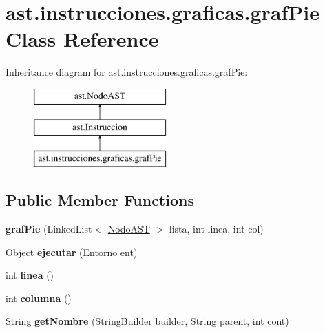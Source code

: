 \hypertarget{classast_1_1instrucciones_1_1graficas_1_1graf_pie}{}\section{ast.\+instrucciones.\+graficas.\+graf\+Pie Class Reference}
\label{classast_1_1instrucciones_1_1graficas_1_1graf_pie}
Inheritance diagram for ast.\+instrucciones.\+graficas.\+graf\+Pie\+:\begin{figure}[H]
\begin{center}
\leavevmode
\includegraphics[height=3.000000cm]{classast_1_1instrucciones_1_1graficas_1_1graf_pie}
\end{center}
\end{figure}
\subsection*{Public Member Functions}
\begin{DoxyCompactItemize}
\item 
\mbox{\label{classast_1_1instrucciones_1_1graficas_1_1graf_pie_a2b80b9a72bc90648fefa60db2c270a4e}} 
{\bfseries graf\+Pie} (Linked\+List$<$ \mbox{\hyperlink{interfaceast_1_1_nodo_a_s_t}{Nodo\+A\+ST}} $>$ lista, int linea, int col)
\item 
\mbox{\label{classast_1_1instrucciones_1_1graficas_1_1graf_pie_a45f33cf7909cacc00c5a054e8aaba542}} 
Object {\bfseries ejecutar} (\mbox{\hyperlink{classentorno_1_1_entorno}{Entorno}} ent)
\item 
\mbox{\label{classast_1_1instrucciones_1_1graficas_1_1graf_pie_ac803b32e4b36613c1fc10dbed0b70380}} 
int {\bfseries linea} ()
\item 
\mbox{\label{classast_1_1instrucciones_1_1graficas_1_1graf_pie_ae5439efc0d77ecc7648ba7bc4c554e84}} 
int {\bfseries columna} ()
\item 
\mbox{\label{classast_1_1instrucciones_1_1graficas_1_1graf_pie_a4c07767b653a053e24a5f22226d603bf}} 
String {\bfseries get\+Nombre} (String\+Builder builder, String parent, int cont)
\end{DoxyCompactItemize}


